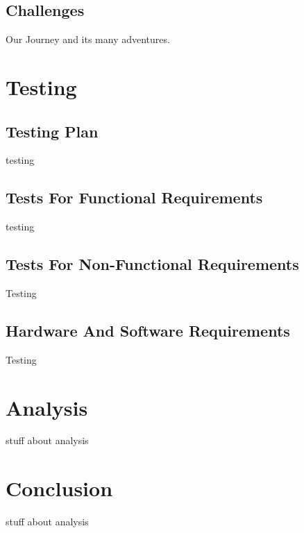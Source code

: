 \documentclass[11pt]{report}
\begin{document}
\section{Challenges}
Our Journey and its many adventures.




\chapter{Testing}

\section{Testing Plan}
testing


\section{Tests For Functional Requirements}
testing


\section{Tests For Non-Functional Requirements}
Testing

\section{Hardware And Software Requirements}
Testing



\chapter{Analysis}
stuff about analysis



\chapter{Conclusion}
stuff about analysis

\end{document}
